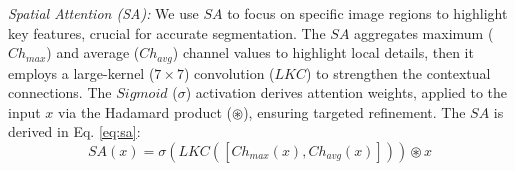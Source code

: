 \noindent \textit{Spatial Attention (SA):} 
We use $SA$ \cite{chen2017sca} to focus on specific image regions to highlight key features, crucial for accurate segmentation. The $SA$ aggregates maximum ($Ch_{max}$) and average ($Ch_{avg}$) channel values to highlight local details, then it employs a large-kernel ($7 \times 7$) convolution ($LKC$) to strengthen the contextual connections. The $Sigmoid$ ($\sigma$) activation derives attention weights, applied to the input $x$ via the Hadamard product ($\circledast$), ensuring targeted refinement. The $SA$ is derived in Eq. \ref{eq:sa}:
\begin{equation}
    SA(x) = \sigma(LKC([Ch_{max}(x), Ch_{avg}(x)])) \circledast x
    \label{eq:sa}
\end{equation}
\normalsize

